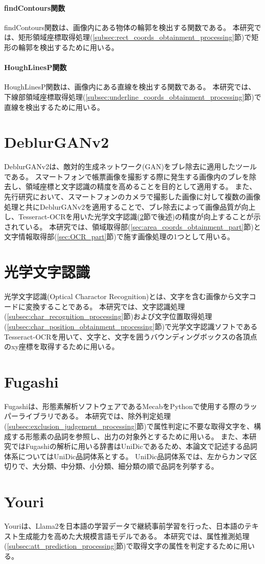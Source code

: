 \paragraph{findContours関数}
findContours関数は、画像内にある物体の輪郭を検出する関数である。
本研究では、矩形領域座標取得処理(\ref{subsec:rect_coords_obtainment_processing}節)で矩形の輪郭を検出するために用いる。

\paragraph{HoughLinesP関数}
HoughLinesP関数は、画像内にある直線を検出する関数である。
本研究では、下線部領域座標取得処理(\ref{subsec:underline_coords_obtainment_processing}節)で直線を検出するために用いる。

\section{DeblurGANv2}\label{sec:DeblurGANv2}
DeblurGANv2は、敵対的生成ネットワーク(GAN)をブレ除去に適用したツールである\cite{DeblurGANv2}。
スマートフォンで帳票画像を撮影する際に発生する画像内のブレを除去し、領域座標と文字認識の精度を高めることを目的として適用する。
また、先行研究において、スマートフォンのカメラで撮影した画像に対して複数の画像処理と共にDeblurGANv2を適用することで、ブレ除去によって画像品質が向上し、Tesseract-OCRを用いた光学文字認識(\ref{sec:Optical-Charactor-Recognition}節で後述)の精度が向上することが示されている\cite{DeblurGANv2の先行研究}。
本研究では、領域取得部(\ref{sec:area_coords_obtainment_part}節)と文字情報取得部(\ref{sec:OCR_part}節)で施す画像処理の1つとして用いる。


\section{光学文字認識}\label{sec:Optical-Charactor-Recognition}
光学文字認識(Optical Charactor Recognition)とは、文字を含む画像から文字コードに変換することである\cite{光学文字認識}。
本研究では、文字認識処理(\ref{subsec:char_recognition_processing}節)および文字位置取得処理(\ref{subsec:char_position_obtainment_processing}節)で光学文字認識ソフトであるTesseract-OCRを用いて、文字と、文字を囲うバウンディングボックスの各頂点のxy座標を取得するために用いる。

\section{Fugashi}\label{sec:Fugashi}
Fugashiは、形態素解析ソフトウェアであるMecabをPythonで使用する際のラッパーライブラリである\cite{Fugashi}。
本研究では、除外判定処理(\ref{subsec:exclusion_judgement_processing}節)で属性判定に不要な取得文字を、構成する形態素の品詞を参照し、出力の対象外とするために用いる。
また、本研究ではFugashiの解析に用いる辞書はUniDicであるため、本論文で記述する品詞体系についてはUniDic品詞体系とする。
UniDic品詞体系では、左からカンマ区切りで、大分類、中分類、小分類、細分類の順で品詞を列挙する\cite{UniDic品詞体系}。


\section{Youri}\label{sec:Youri}
Youriは、Llama2を日本語の学習データで継続事前学習を行った、日本語のテキスト生成能力を高めた大規模言語モデルである\cite{Youri}。
本研究では、属性推測処理(\ref{subsec:att_prediction_processing}節)で取得文字の属性を判定するために用いる。